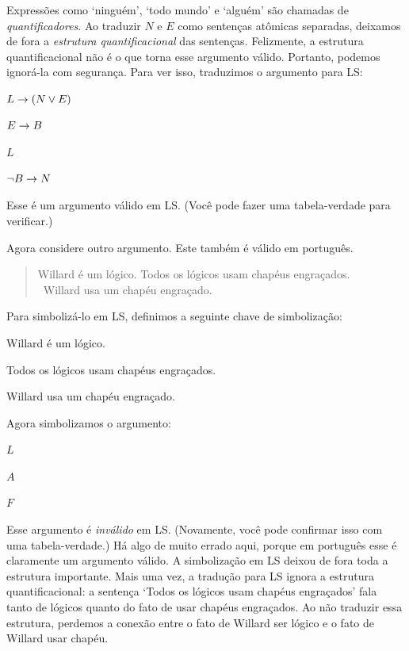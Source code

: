 Expressões como `ninguém', `todo mundo' e `alguém' são chamadas de \emph{quantificadores}. Ao traduzir $N$ e $E$ como sentenças atômicas separadas, deixamos de fora a \emph{estrutura quantificacional} das sentenças. Felizmente, a estrutura quantificacional não é o que torna esse argumento válido. Portanto, podemos ignorá-la com segurança. Para ver isso, traduzimos o argumento para LS:
\begin{earg}
\item[]$L \rightarrow (N \vee E)$
\item[]$E \rightarrow B$
\item[]$L$
\item[\therefore]$\neg B \rightarrow N$
\end{earg}
Esse é um argumento válido em LS. (Você pode fazer uma tabela-verdade para verificar.)

Agora considere outro argumento. Este também é válido em português.

\begin{quote}
\label{willard1}
Willard é um lógico. Todos os lógicos usam chapéus engraçados.\\
\therefore\ Willard usa um chapéu engraçado.
\end{quote}

Para simbolizá-lo em LS, definimos a seguinte chave de simbolização:
\begin{ekey}
\item[L:] Willard é um lógico.
\item[A:] Todos os lógicos usam chapéus engraçados.
\item[F:] Willard usa um chapéu engraçado.
\end{ekey}

Agora simbolizamos o argumento:
\begin{earg}
\item[]$L$
\item[]$A$
\item[\therefore] $F$
\end{earg}

Esse argumento é \emph{inválido} em LS. (Novamente, você pode confirmar isso com uma tabela-verdade.) Há algo de muito errado aqui, porque em português esse é claramente um argumento válido. A simbolização em LS deixou de fora toda a estrutura importante. Mais uma vez, a tradução para LS ignora a estrutura quantificacional: a sentença `Todos os lógicos usam chapéus engraçados' fala tanto de lógicos quanto do fato de usar chapéus engraçados. Ao não traduzir essa estrutura, perdemos a conexão entre o fato de Willard ser lógico e o fato de Willard usar chapéu.

